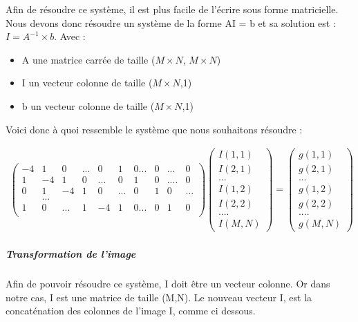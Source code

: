Afin de résoudre ce système, il est plus facile de l'écrire sous forme matricielle. Nous devons donc résoudre un système de la forme AI = b et sa solution est :  $I = A^{-1}\times b$.
Avec : 
\begin{itemize}
\item A une matrice carrée de taille ($M\times N$, $M\times N$)
\item I un vecteur colonne de taille ($M\times N$,1)
\item b un vecteur colonne de taille ($M\times N$,1)
\end{itemize}
Voici donc à quoi ressemble le système que nous souhaitons résoudre :
\begin{center}

\begin{equation}
\left.
\begin{aligned}
\begin{pmatrix}
	-4 & 1 & 0 & ...& 0 & 1 & 0...&0& ... & 0\\
	1 & -4 & 1 & 0 & ... & 0 &1 &0&....&0\\
	0 & 1 & -4 & 1 & 0&... &0 &1 &0&...\\
	&...\\
	1 & 0 &... &1 &-4 &1 &0...& 0& 1 & 0\\
\end{pmatrix}
\begin{pmatrix}
I(1,1)\\
I(2,1)\\
...\\
I(1,2)\\
I(2,2)\\
....\\
I(M, N)
\end{pmatrix}
= 
\begin{pmatrix}
g(1,1)\\
g(2,1)\\
...\\
g(1,2)\\
g(2,2)\\
....\\
g(M, N)
\end{pmatrix}
\end{aligned}
\right.
\end{equation}
\end{center}

\subparagraph{Transformation de l'image}
Afin de pouvoir résoudre ce système, I doit être un vecteur colonne. Or dans notre cas, I est une matrice de taille (M,N). Le nouveau vecteur I, est la concaténation des colonnes de l'image I, comme ci dessous.

